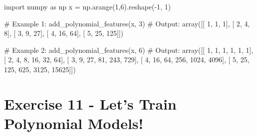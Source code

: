 \documentclass[]{article}
\newenvironment{Shaded}{\begin{snugshade}}{\end{snugshade}}
\newcommand{\CommentTok}[1]{\textcolor[rgb]{0.48,0.49,0.49}{#1}}
\newcommand{\DecValTok}[1]{\textcolor[rgb]{0.96,0.45,0.00}{#1}}
\newcommand{\ImportTok}[1]{\textcolor[rgb]{0.15,0.68,0.38}{#1}}
\newcommand{\NormalTok}[1]{\textcolor[rgb]{0.81,0.81,0.76}{#1}}
\newcommand{\OperatorTok}[1]{\textcolor[rgb]{0.81,0.81,0.76}{#1}}
\begin{document}
\begin{Shaded}
\begin{Highlighting}[]
\ImportTok{import}\NormalTok{ numpy }\ImportTok{as}\NormalTok{ np}
\NormalTok{x }\OperatorTok{=}\NormalTok{ np.arange(}\DecValTok{1}\NormalTok{,}\DecValTok{6}\NormalTok{).reshape(}\OperatorTok{-}\DecValTok{1}\NormalTok{, }\DecValTok{1}\NormalTok{)}

\CommentTok{# Example 1:}
\NormalTok{add_polynomial_features(x, }\DecValTok{3}\NormalTok{)}
\CommentTok{# Output:}
\NormalTok{array([[  }\DecValTok{1}\NormalTok{,   }\DecValTok{1}\NormalTok{,   }\DecValTok{1}\NormalTok{],}
\NormalTok{       [  }\DecValTok{2}\NormalTok{,   }\DecValTok{4}\NormalTok{,   }\DecValTok{8}\NormalTok{],}
\NormalTok{       [  }\DecValTok{3}\NormalTok{,   }\DecValTok{9}\NormalTok{,  }\DecValTok{27}\NormalTok{],}
\NormalTok{       [  }\DecValTok{4}\NormalTok{,  }\DecValTok{16}\NormalTok{,  }\DecValTok{64}\NormalTok{],}
\NormalTok{       [  }\DecValTok{5}\NormalTok{,  }\DecValTok{25}\NormalTok{, }\DecValTok{125}\NormalTok{]])}


\CommentTok{# Example 2:}
\NormalTok{add_polynomial_features(x, }\DecValTok{6}\NormalTok{)}
\CommentTok{# Output:}
\NormalTok{array([[    }\DecValTok{1}\NormalTok{,     }\DecValTok{1}\NormalTok{,     }\DecValTok{1}\NormalTok{,     }\DecValTok{1}\NormalTok{,     }\DecValTok{1}\NormalTok{,     }\DecValTok{1}\NormalTok{],}
\NormalTok{       [    }\DecValTok{2}\NormalTok{,     }\DecValTok{4}\NormalTok{,     }\DecValTok{8}\NormalTok{,    }\DecValTok{16}\NormalTok{,    }\DecValTok{32}\NormalTok{,    }\DecValTok{64}\NormalTok{],}
\NormalTok{       [    }\DecValTok{3}\NormalTok{,     }\DecValTok{9}\NormalTok{,    }\DecValTok{27}\NormalTok{,    }\DecValTok{81}\NormalTok{,   }\DecValTok{243}\NormalTok{,   }\DecValTok{729}\NormalTok{],}
\NormalTok{       [    }\DecValTok{4}\NormalTok{,    }\DecValTok{16}\NormalTok{,    }\DecValTok{64}\NormalTok{,   }\DecValTok{256}\NormalTok{,  }\DecValTok{1024}\NormalTok{,  }\DecValTok{4096}\NormalTok{],}
\NormalTok{       [    }\DecValTok{5}\NormalTok{,    }\DecValTok{25}\NormalTok{,   }\DecValTok{125}\NormalTok{,   }\DecValTok{625}\NormalTok{,  }\DecValTok{3125}\NormalTok{, }\DecValTok{15625}\NormalTok{]])}
\end{Highlighting}
\end{Shaded}

\clearpage

\hypertarget{exercise-11---lets-train-polynomial-models-1}{%
\section{Exercise 11 - Let's Train Polynomial
Models!}\label{exercise-11---lets-train-polynomial-models-1}}
\end{document}
